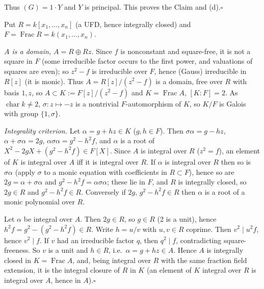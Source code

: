 \documentclass[11pt]{article}
\begin{document}
Thus $(G)=1\cdot Y$ and $Y$ is principal. This proves the Claim and (d).\hfill$\square$

\pf
Put $R=k[x_1,\dots,x_n]$ (a UFD, hence integrally closed) and $F=\operatorname{Frac}R=k(x_1,\dots,x_n)$.

\emph{$A$ is a domain, $A=R\oplus Rz$.} Since $f$ is nonconstant and square-free, it is not a square in $F$ (some irreducible factor occurs to the first power, and valuations of squares are even); so $z^2-f$ is irreducible over $F$, hence (Gauss) irreducible in $R[z]$ (it is monic). Thus $A=R[z]/(z^2-f)$ is a domain, free over $R$ with basis $1,z$, so $A\subset K:=F[z]/(z^2-f)$ and $K=\operatorname{Frac}A$, $[K:F]=2$. As $\operatorname{char}k\ne2$, $\sigma:z\mapsto-z$ is a nontrivial $F$-automorphism of $K$, so $K/F$ is Galois with group $\{1,\sigma\}$.

\emph{Integrality criterion.} Let $\alpha=g+hz\in K$ ($g,h\in F$). Then $\sigma\alpha=g-hz$, $\alpha+\sigma\alpha=2g$, $\alpha\sigma\alpha=g^2-h^2f$, and $\alpha$ is a root of $X^2-2gX+(g^2-h^2f)\in F[X]$. Since $A$ is integral over $R$ ($z^2=f$), an element of $K$ is integral over $A$ iff it is integral over $R$. If $\alpha$ is integral over $R$ then so is $\sigma\alpha$ (apply $\sigma$ to a monic equation with coefficients in $R\subset F$), hence so are $2g=\alpha+\sigma\alpha$ and $g^2-h^2f=\alpha\sigma\alpha$; these lie in $F$, and $R$ is integrally closed, so $2g\in R$ and $g^2-h^2f\in R$. Conversely if $2g,\,g^2-h^2f\in R$ then $\alpha$ is a root of a monic polynomial over $R$.

Let $\alpha$ be integral over $A$. Then $2g\in R$, so $g\in R$ (2 is a unit), hence $h^2f=g^2-(g^2-h^2f)\in R$. Write $h=u/v$ with $u,v\in R$ coprime. Then $v^2\mid u^2f$, hence $v^2\mid f$. If $v$ had an irreducible factor $q$, then $q^2\mid f$, contradicting square-freeness. So $v$ is a unit and $h\in R$, i.e.\ $\alpha=g+hz\in A$. Hence $A$ is integrally closed in $K=\operatorname{Frac}A$, and, being integral over $R$ with the same fraction field extension, it is the integral closure of $R$ in $K$ (an element of $K$ integral over $R$ is integral over $A$, hence in $A$).\hfill$\square$
\end{document}
